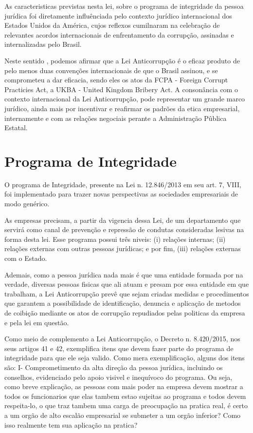 As caracteristicas previstas nesta lei, sobre o programa de integridade da pessoa jurídica foi diretamente influênciada pelo contexto jurídico internacional dos Estados Unidos da América, cujos reflexos cumilnaram na celebração de relevantes acordos internacionais de enfrentamento da corrupção, assinadas e internalizadas pelo Brasil. 

Neste sentido , podemos afirmar que a Lei Anticorrupção é o eficaz produto de pelo menos duas convenções internacionais de que o Brasil assinou, e se comprometeu a dar eficacia, sendo eles os atos da FCPA - Foreign Corrupt Practicies Act, a UKBA - United Kingdom Bribery Act. A consonância com o contexto internacional da Lei Anticorrupção, pode representar um grande marco jurídico, ainda mais por incentivar e reafirmar os padrões da etica empresarial, internamente e com as relações negociais perante a Administração Pûblica Estatal. 

\section{Programa de Integridade}

O programa de Integridade, presente na Lei n. 12.846/2013 em seu art. 7, VIII, foi implementado para trazer novas perspectivas as sociedades empresariais de modo genérico. 

As empresas precisam, a partir da vigencia dessa Lei, de um departamento que servirá como canal de prevenção e repressão de condutas consideradas lesivas na forma desta lei. Esse programa possui três niveis: (i) relações internas; (ii) relações externas com outras pessoas jurídicas; e por fim, (iii) relações externas com o Estado. 

Ademais, como a pessoa jurídica nada mais é que uma entidade formada por na verdade, diversas pessoas fisicas que ali atuam e presam por essa entidade em que trabalham, a Lei Anticorrupção prevê que sejam criadas medidas e procedimentos que garantem a possibilidade de identificação, denuncia e aplicação de metodos de coibição mediante os atos de corrupção repudiados pelas politicas da empresa e pela lei em questão. 

Como meio de complemento a Lei Anticorrupção, o Decreto n. 8.420/2015, nos seus artigos 41 e 42, exemplifica itens que devem fazer parte do programa de integridade para que ele seja valido. Como mera exemplificação, alguns dos itens são: I- Comprometimento da alta direção da pessoa jurídica, incluindo os conselhos, evidenciado pelo apoio visivel e inequívoco do programa. Ou seja, como breve explicação, as pessoas com mais poder na empresa devem mostrar a todos os funcionarios que elas tambem estao sujeitas ao programa e todos devem respeita-lo, o que traz tambem uma carga de preocupação na pratica real, é certo a um orgão de alto escalão empresarial se submeter a um orgão inferior? Como isso realmente tem sua aplicação na pratica?

